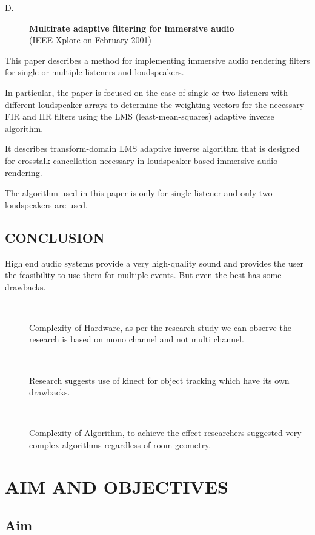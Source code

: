 \documentclass[twocolumn]{report}
\begin{document}
\begin{description}
    \item[D.]\textbf{Multirate adaptive filtering for immersive audio}\\(IEEE Xplore  on February 2001)
\end{description}

This paper describes a method for implementing immersive audio 
rendering filters for single or multiple listeners and loudspeakers.

In particular, the paper is focused on the case of single or two 
listeners with different loudspeaker arrays to determine the weighting 
vectors for the necessary FIR and IIR filters using the LMS (least-mean-squares) 
adaptive inverse algorithm.

It describes transform-domain LMS adaptive inverse algorithm that is 
designed for crosstalk cancellation necessary in loudspeaker-based 
immersive audio rendering. 

The algorithm used in this paper is only for single listener and 
only two loudspeakers are used.

\section{CONCLUSION}

High end audio systems provide a very high-quality sound and provides 
the user the feasibility to use them for multiple events. But even the 
best has some drawbacks.

\begin{description}
    \item[-]Complexity of Hardware, as per the research study we can 
            observe the research is based on mono channel and not multi channel. 
    \item[-]Research suggests use of kinect for object tracking which have its 
            own drawbacks.
    \item[-]Complexity of Algorithm, to achieve the effect researchers suggested 
            very complex algorithms regardless of room geometry.
\end{description}

\chapter{AIM AND OBJECTIVES}

\section{Aim}
\end{document}
